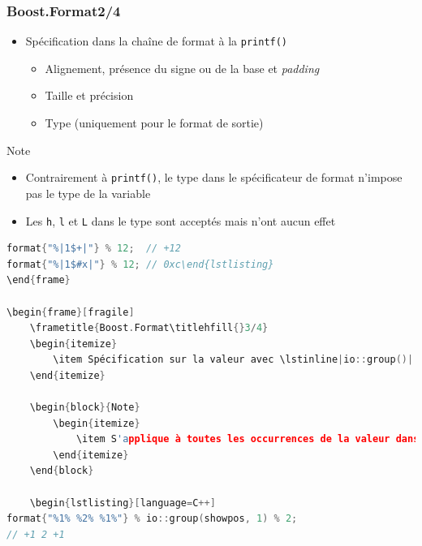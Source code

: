\documentclass[C++.tex]{subfiles}
\begin{document}
\begin{frame}[fragile]
	\frametitle{Boost.Format\titlehfill{}2/4}
	\begin{itemize}
		\item Spécification dans la chaîne de format à la \lstinline|printf()|
		\begin{itemize}
			\item Alignement, présence du signe ou de la base et \textit{padding}
			\item Taille et précision
			\item Type (uniquement pour le format de sortie)
		\end{itemize}
	\end{itemize}

	\begin{block}{Note}
		\begin{itemize}
			\item Contrairement à \lstinline|printf()|, le type dans le spécificateur de format n'impose pas le type de la variable
			\item Les \lstinline|h|, \lstinline|l| et \lstinline|L| dans le type sont acceptés mais n'ont aucun effet
		\end{itemize}
	\end{block}

	\begin{lstlisting}[language=C++]
format{"%|1$+|"} % 12;  // +12
format{"%|1$#x|"} % 12;	// 0xc\end{lstlisting}
\end{frame}

\begin{frame}[fragile]
	\frametitle{Boost.Format\titlehfill{}3/4}
	\begin{itemize}
		\item Spécification sur la valeur avec \lstinline|io::group()|
	\end{itemize}

	\begin{block}{Note}
		\begin{itemize}
			\item S'applique à toutes les occurrences de la valeur dans la chaîne
		\end{itemize}
	\end{block}

	\begin{lstlisting}[language=C++]
format{"%1% %2% %1%"} % io::group(showpos, 1) % 2; 
// +1 2 +1\end{lstlisting}
\end{frame}
\end{document}
